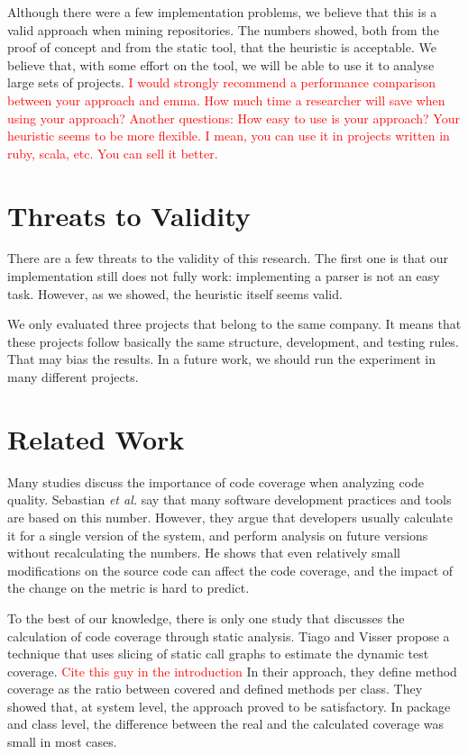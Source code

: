 \documentclass{sig-alternate}
\begin{document}
Although there were a few implementation problems, we believe that this is a valid approach
when mining repositories. The numbers showed, both from the proof of concept and from the
static tool, that the heuristic is acceptable. We believe that, with some effort on the tool,
we will be able to use it to analyse large sets of projects. \textcolor{red}{I would strongly recommend a performance comparison between your approach and emma. How much time a researcher will save when using your approach? Another questions: How easy to use is your approach? Your heuristic seems to be more flexible. I mean, you can use it in projects written in ruby, scala, etc. You can sell it better.}


\section{Threats to Validity}
\label{sec-threats}

There are a few threats to the validity of this research. The first one is that our implementation
still does not fully work: implementing a parser is not an easy task. However, as we showed, the 
heuristic itself seems valid. 

We only evaluated three projects that belong to the same company. It means that these projects
follow basically the same structure, development, and testing rules. That may bias the results.
In a future work, we should run the experiment in many different projects.

\section{Related Work}
\label{sec-related-work}

Many studies discuss the importance of code coverage when analyzing code quality. 
Sebastian \textit{et al.} \cite{sebastian} say that many software development practices and tools
are based on this number. However, they argue that developers usually calculate it for a single
version of the system, and perform analysis on future versions without recalculating the numbers.
He shows that even relatively small modifications on the source code can affect the code coverage, 
and the impact of the change on the metric is hard to predict.

To the best of our knowledge, there is only one study that discusses the calculation of
code coverage through static analysis. Tiago and Visser \cite{tiago} propose a
technique that uses slicing of static call graphs to estimate the
dynamic test coverage. \textcolor{red}{Cite this guy in the introduction}
In their approach, they define method coverage as the ratio between covered 
and defined methods per class. They showed that, at system level, the approach
proved to be satisfactory. In package and class level, the difference between
the real and the calculated coverage was small in most cases.
\end{document}
